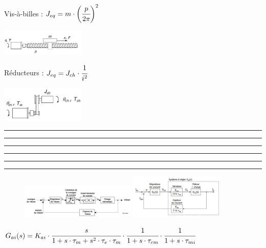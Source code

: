 \documentclass[	DIV=calc,%
							paper=a4,%
							fontsize=10pt,%
							twocolumn]{scrartcl} %
\newcommand{\hformbar}[1]{\bigskip \hrule \vspace{1pt} \hrule \vspace{5pt}} %
\newcounter{mycounter}
\newcommand{\formdesc}[1]{\large\textbf{#1} \addtocounter{mycounter}{1} \hfill \themycounter \\ \vspace{-3mm} \hrule \vspace{2mm}}
\begin{document}
\vspace{1cm}

Vis-à-billes : $J_{eq} = m \cdot \biggl(\cfrac{p}{2\pi}\biggr)^2$

{\centering \includegraphics[width = 0.3\textwidth]{img/vis.JPG}}

Réducteurs : $J_{eq} = J_{ch}\cdot \cfrac{1}{i^2}$

{\centering \includegraphics[width = 0.3\textwidth]{img/Reducteur.JPG}}

\hformbar


\formdesc{Réglage de la tension / vitesse}

\hformbar

\formdesc{Anti-windup}

\hformbar

\formdesc{Réglage du courant / couple}
\begin{figure}[H]
    \begin{center}
        \includegraphics[width = 0.49\textwidth]{img/Regulation_courrant.JPG}

        \includegraphics[width = 0.4\textwidth]{img/Regulation_courrant_Gai.JPG}

    \end{center}
\end{figure}

{\footnotesize $G_{ai}(s) = K_{ai} \cdot \cfrac{s}{1+s \cdot \tau_m + s^2 \cdot \tau_e \cdot \tau_m} \cdot \cfrac{1}{1+s \cdot \tau_{cm}}\cdot \cfrac{1}{1+s \cdot \tau_{mi}} $}

\vspace{3mm}
\end{document}
